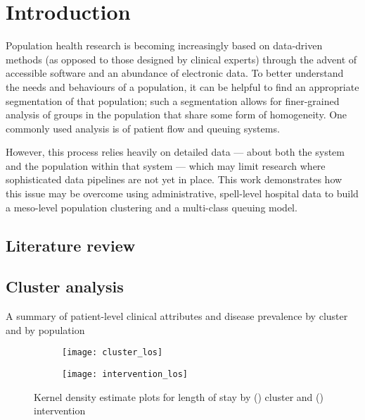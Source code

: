 \section{Introduction}\label{sec:intro}

Population health research is becoming increasingly based on data-driven methods
(as opposed to those designed by clinical experts) through the advent of
accessible software and an abundance of electronic data. To better understand
the needs and behaviours of a population, it can be helpful to find an
appropriate segmentation of that population; such a segmentation allows for
finer-grained analysis of groups in the population that share some form of
homogeneity. One commonly used analysis is of patient flow and queuing systems.

However, this process relies heavily on detailed data --- about both the system
and the population within that system --- which may limit research where
sophisticated data pipelines are not yet in place. This work demonstrates how
this issue may be overcome using administrative, spell-level hospital data to
build a meso-level population clustering and a multi-class queuing model.


\subsection{Literature review}\label{subsec:review}


\subsection{Cluster analysis}\label{subsec:clusters}

\begin{table}
    \centering
    
    \caption{A summary of patient-level clinical attributes and disease
    prevalence by cluster and by population}\label{tab:summary}
\end{table}

\begin{figure}
    \centering
    \begin{subfigure}{\halfimgwidth}
        \texttt{[image: cluster\_los]}
        \caption{}\label{fig:cluster_los}
    \end{subfigure}\hfill%
    \begin{subfigure}{\halfimgwidth}
        \texttt{[image: intervention\_los]}
        \caption{}\label{fig:intervention_los}
    \end{subfigure}
    \caption{%
        Kernel density estimate plots for length of stay by
        () cluster and ()
        intervention
    }\label{fig:los_kde}
\end{figure}

